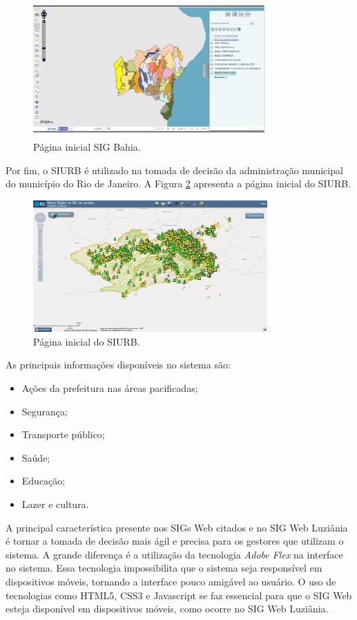 \newpage

\begin{figure}[h]
\centering
\includegraphics[width=0.80\textwidth]{./img/cap_IV/31-SIGBahia}
\caption{Página inicial SIG Bahia.}
\label{fig:SIGBahia}
\end{figure}

Por fim, o SIURB \cite{siurg} é utilizado na tomada de decisão da administração municipal do município do Rio de Janeiro. A Figura \ref{fig:SIURB} apresenta a página inicial do SIURB.

\begin{figure}[h]
\centering
\includegraphics[width=0.80\textwidth]{./img/cap_IV/32-SIURB}
\caption{Página inicial do SIURB.}
\label{fig:SIURB}
\end{figure}

As principais informações disponíveis no sistema são:

\begin{itemize}
\item Ações da prefeitura nas áreas pacificadas;
\item Segurança;
\item Transporte público;
\item Saúde;
\item Educação;
\item Lazer e cultura.
\end{itemize}

A principal característica presente nos SIGs Web citados e no SIG Web Luziânia é tornar a tomada de decisão mais ágil e precisa para os gestores que utilizam o sistema. A grande diferença é a utilização da tecnologia \textit{Adobe Flex} na interface no sistema. Essa tecnologia impossibilita que o sistema seja responsível em dispositivos móveis, tornando a interface pouco amigável ao usuário. O uso de tecnologias como HTML5, CSS3 e Javascript se faz essencial para que o SIG Web esteja disponível em dispositivos móveis, como ocorre no SIG Web Luziânia.